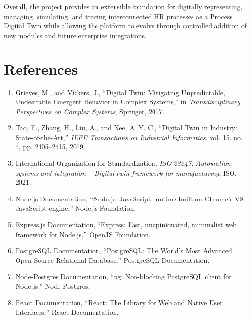 \documentclass[12pt,a4paper]{article}
\begin{document}
Overall, the project provides an extensible foundation for
digitally representing, managing, simulating, and tracing
interconnected HR processes as a Process Digital Twin while allowing
the platform to evolve through controlled addition of new modules
and future enterprise integrations.


\newpage

\section{References}

\begin{enumerate}

    \item Grieves, M., and Vickers, J.,
    ``Digital Twin: Mitigating Unpredictable, Undesirable Emergent
    Behavior in Complex Systems,'' in
    \textit{Transdisciplinary Perspectives on Complex Systems},
    Springer, 2017.

    \item Tao, F., Zhang, H., Liu, A., and Nee, A. Y. C.,
    ``Digital Twin in Industry: State-of-the-Art,''
    \textit{IEEE Transactions on Industrial Informatics},
    vol. 15, no. 4, pp. 2405--2415, 2019.

    \item International Organization for Standardization,
    \textit{ISO 23247: Automation systems and integration --
    Digital twin framework for manufacturing},
    ISO, 2021.

    \item Node.js Documentation,
    ``Node.js: JavaScript runtime built on Chrome's V8 JavaScript engine,''
    Node.js Foundation.

    \item Express.js Documentation,
    ``Express: Fast, unopinionated, minimalist web framework for Node.js,''
    OpenJS Foundation.

    \item PostgreSQL Documentation,
    ``PostgreSQL: The World's Most Advanced Open Source Relational
    Database,'' PostgreSQL Documentation.

    \item Node-Postgres Documentation,
    ``pg: Non-blocking PostgreSQL client for Node.js,''
    Node-Postgres.

    \item React Documentation,
    ``React: The Library for Web and Native User Interfaces,''
    React Documentation.

\end{enumerate}

\end{document}
